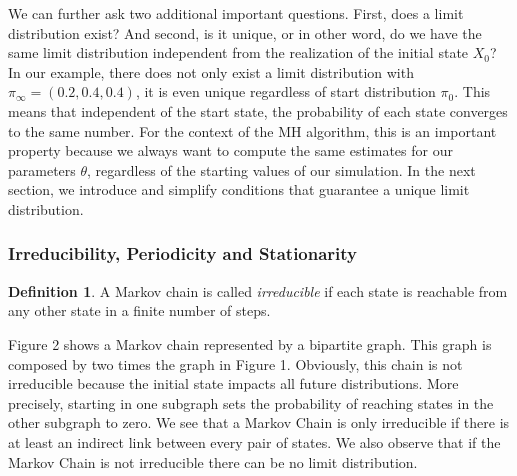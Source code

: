 \documentclass[12pt,english,a4paper,oneside]{article}
\theoremstyle{definition}
\newtheorem{definition}{Definition}[section]
\theoremstyle{definition}
\theoremstyle{definition}
\theoremstyle{definition}
\theoremstyle{remark}
\begin{document}
\noindent
We can further ask two additional important questions. First, does a limit distribution exist? And second, is it unique, or in other word, do we have the same limit distribution independent from the realization of the initial state \(X_0\)? In our example, there does not only exist a limit distribution with \(\pi_{\infty} = (0.2, 0.4, 0.4)\), it is even unique regardless of start distribution \(\pi_0\). This means that independent of the start state, the probability of each state converges to the same number. For the context of the MH algorithm, this is an important property because we always want to compute the same estimates for our parameters \(\theta\), regardless of the starting values of our simulation. In the next section, we introduce and simplify conditions that guarantee a unique limit distribution.

\hypertarget{irreducibility-periodicity-and-stationarity}{%
\subsubsection{Irreducibility, Periodicity and Stationarity}\label{irreducibility-periodicity-and-stationarity}}

\begin{definition}
A Markov chain is called \textit{irreducible} if each state is reachable from any other state in a finite number of steps.
\end{definition}

\noindent
Figure 2 shows a Markov chain represented by a bipartite graph. This graph is composed by two times the graph in Figure 1. Obviously, this chain is not irreducible because the initial state impacts all future distributions. More precisely, starting in one subgraph sets the probability of reaching states in the other subgraph to zero. We see that a Markov Chain is only irreducible if there is at least an indirect link between every pair of states. We also observe that if the Markov Chain is not irreducible there can be no limit distribution.
\end{document}
